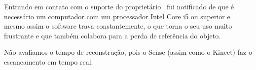 Entrando em contato com o suporte do proprietário~\cite{3DSystems} fui notificado de que é necessário um computador com um processador Intel Core i5 ou superior e mesmo assim o software trava constantemente, o que torna o seu uso muito frustrante e que também colabora para a perda de referência do objeto.


%
%
%

Não avaliamos o tempo de reconstrução, pois o Sense (assim como o Kinect) faz o escaneamento em tempo real.